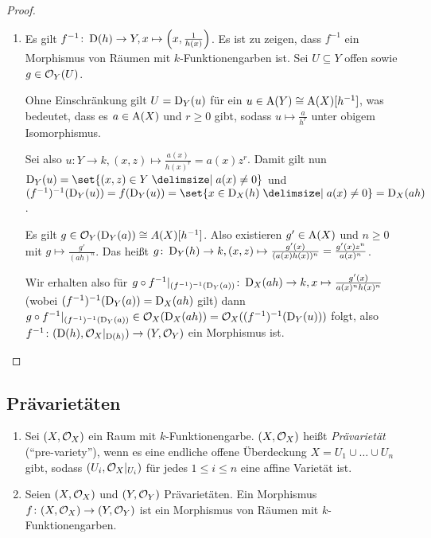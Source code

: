\documentclass[12pt,a4paper]{scrartcl}
\theoremstyle{cplain}
\theoremstyle{cdef}
\begin{document}
\begin{proof}
\begin{enumerate}[label=\ref{lem:10.13:\roman*}]
\begin{enumerate}[label=\ref{lem:10.13:ii:\alph*}]
			\item Es gilt $f^{-1}\colon \operatorname{D}(h)\to Y, x\mapsto \left(x,\frac 1{h(x)}\right)$. Es ist zu zeigen, dass $f^{-1}$ ein Morphismus von Räumen mit $k$-Funktionengarben ist. Sei $U\subseteq Y$ offen sowie $g\in \mathcal{O}_Y(U)$.
			
			Ohne Einschränkung gilt $U = \operatorname{D}_Y(u)$ für ein $u\in \operatorname{A}(Y) \cong \operatorname{A}(X)[h^{-1}]$, was bedeutet, dass es $a\in \operatorname{A}(X)$ und $r\ge 0$ gibt, sodass $u\mapsto \frac a{h^r}$ unter obigem Isomorphismus.
			
			Sei also $u\colon Y\to k, (x,z)\mapsto \frac{a(x)}{h(x)^r} = a(x)z^r$. Damit gilt nun $\D_Y(u) = \set{(x,z)\in Y\given a(x) \neq 0}$ und $(f^{-1})^{-1}(\D_Y(u)) = f(\D_Y(u)) = \set {x\in \D_X(h)\given a(x) \neq 0} = \D_X(ah)$.
			
			Es gilt $g\in \mathcal{O}_Y(\operatorname{D}_Y(a)) \cong A(X)[h^{-1}]$. Also existieren $g'\in \operatorname{A}(X)$ und $n\ge 0$ mit $g\mapsto \frac{g'}{(ah)^n}$. Das heißt $g\colon \operatorname{D}_Y(h)\to k, (x,z)\mapsto \frac{g'(x)}{(a(x)h(x))^n} = \frac{g'(x)z^n}{a(x)^n}$.
			
			Wir erhalten also für $g\circ f^{-1}|_{(f^{-1})^{-1}(\operatorname{D}_Y(a))} \colon \operatorname{D}_X(ah)\to k, x\mapsto \frac{g'(x)}{a(x)^nh(x)^n}$ (wobei $(f^{-1})^{-1}(\operatorname{D}_Y(a)) = \operatorname{D}_X(ah)$ gilt) dann $g\circ f^{-1}|_{(f^{-1})^{-1}(\operatorname{D}_Y(a))} \in \mathcal{O}_X(\operatorname{D}_X(ah)) = \mathcal{O}_X((f^{-1})^{-1}(\operatorname{D}_Y(u)))$ folgt, also $f^{-1}\colon (\operatorname{D}(h), \mathcal{O}_X|_{\operatorname{D}(h)}) \to (Y,\mathcal{O}_Y)$ ein Morphismus ist.
			\qedhere
		\end{enumerate}
	\end{enumerate}
\end{proof}

\subsection{Prävarietäten}

\begin{defi}
	\leavevmode
	\begin{enumerate}
		\item Sei $(X,\mathcal{O}_X)$ ein Raum mit $k$-Funktionengarbe. $(X,\mathcal{O}_X)$ heißt \emph{Prävarietät} (\enquote{pre-variety}), wenn es eine endliche offene Überdeckung $X = U_1\cup\dots\cup U_n$ gibt, sodass $(U_i,\mathcal{O}_X|_{U_i})$ für jedes $1\le i \le n$ eine affine Varietät ist.
		\item Seien $(X,\mathcal{O}_X)$ und $(Y, \mathcal{O}_Y)$ Prävarietäten. Ein Morphismus $f\colon (X,\mathcal{O}_X)\to (Y,\mathcal{O}_Y)$ ist ein Morphismus von Räumen mit $k$-Funktionengarben.
	\end{enumerate}
\end{defi}
\end{document}
